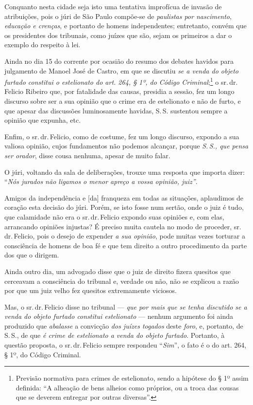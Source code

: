 Conquanto nesta cidade seja isto uma tentativa improfícua de invasão de
atribuições, pois o júri de São Paulo compõe-se de \emph{paulistas por
nascimento}, \emph{educação e crenças}, e portanto de homens
independentes; entretanto, convém que os presidentes dos tribunais, como
juízes que são, sejam os primeiros a dar o exemplo do respeito à lei.

Ainda no dia 15 do corrente por ocasião do resumo dos debates havidos
para julgamento de Manoel José de Castro, em que se discutiu \emph{se a
venda do objeto furtado constitui o estelionato do art. 264, § 1º, do
Código Criminal};\footnote{ Previsão normativa para crimes de
  estelionato, sendo a hipótese do § 1º assim definida: ``A alheação de
  bens alheios como próprios, ou a troca das cousas que se deverem
  entregar por outras diversas''.} o sr.\,dr.\,Felicio Ribeiro que, por
fatalidade das causas, presidia a sessão, fez um longo discurso sobre
ser a sua opinião que o crime era de estelionato e não de furto, e que
apesar das discussões luminosamente havidas, S.\,S. sustentou sempre a
opinião que expunha, etc.

Enfim, o sr.\,dr.\,Felicio, como de costume, fez um longo discurso,
expondo a sua valiosa opinião, cujos fundamentos não podemos alcançar,
porque \emph{S.\,S., que pensa ser orador}, disse cousa nenhuma, apesar
de muito falar.

O júri, voltando da sala de deliberações, trouxe uma resposta que
importa dizer: ``\emph{Nós jurados não ligamos o menor apreço a vossa
opinião, juiz''}.

Amigos da independência e {[}da{]} franqueza em todas as situações,
aplaudimos de coração esta decisão do júri. Porém, se isto fosse num
sertão, onde o juiz é tudo, que calamidade não era o sr.\,dr.\,Felicio
expondo suas opiniões e, com elas, arrancando opiniões injustas? É
preciso muita cautela no modo de proceder, sr.\,dr.\,Felicio, pois o
desejo de expender \emph{a sua opinião}, pode muitas vezes torturar a
consciência de homens de boa fé e que tem direito a outro procedimento
da parte dos que o dirigem.

Ainda outro dia, um advogado disse que o juiz de direito fizera quesitos
que cerceavam a consciência do tribunal e, verdade ou não, não se
explicou a razão por que um juiz velho fez quesitos extremamente
viciosos.

Mas, o sr.\,dr.\,Felicio disse no tribunal --- \emph{que por mais que se
tenha discutido se a venda do objeto furtado constitui estelionato} ---
nenhum argumento foi ainda produzido que \emph{abalasse} a convicção
\emph{dos juízes togados} deste \emph{foro}, e, portanto, de S.\,S., de
que \emph{é crime de estelionato a venda do objeto furtado}. Portanto, à
questão proposta, o sr.\,dr.\,Felicio sempre respondeu ``\emph{Sim}'', o
fato é o do art. 264, § 1º, do Código Criminal.

